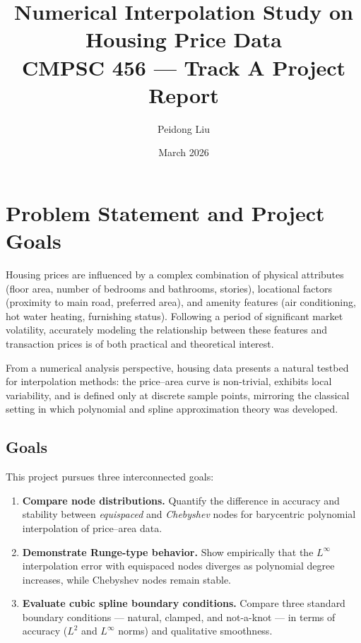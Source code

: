 \documentclass[11pt]{article}
\title{%
  \textbf{Numerical Interpolation Study on Housing Price Data}\\[4pt]
  \large CMPSC 456 --- Track A Project Report
}
\author{Peidong Liu}
\date{March 2026}
\begin{document}
\maketitle
\tableofcontents
\newpage

\section{Problem Statement and Project Goals}

Housing prices are influenced by a complex combination of physical attributes
(floor area, number of bedrooms and bathrooms, stories), locational factors
(proximity to main road, preferred area), and amenity features (air
conditioning, hot water heating, furnishing status).  Following a period of
significant market volatility, accurately modeling the relationship between
these features and transaction prices is of both practical and theoretical
interest.

From a numerical analysis perspective, housing data presents a natural
testbed for interpolation methods: the price--area curve is non-trivial,
exhibits local variability, and is defined only at discrete sample points,
mirroring the classical setting in which polynomial and spline approximation
theory was developed.

\subsection*{Goals}

This project pursues three interconnected goals:

\begin{enumerate}
  \item \textbf{Compare node distributions.}  Quantify the difference in
        accuracy and stability between \emph{equispaced} and \emph{Chebyshev}
        nodes for barycentric polynomial interpolation of price--area data.

  \item \textbf{Demonstrate Runge-type behavior.}  Show empirically that the
        $L^\infty$ interpolation error with equispaced nodes diverges as
        polynomial degree increases, while Chebyshev nodes remain stable.

  \item \textbf{Evaluate cubic spline boundary conditions.}  Compare three
        standard boundary conditions --- natural, clamped, and
        not-a-knot --- in terms of accuracy ($L^2$ and $L^\infty$ norms) and
        qualitative smoothness.
\end{enumerate}
\end{document}
